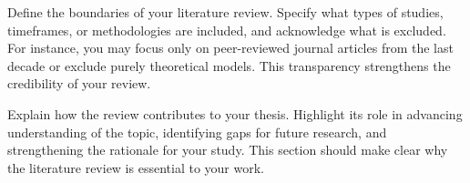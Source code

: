 Define the boundaries of your literature review. Specify what types of studies, timeframes, or methodologies are included, and acknowledge what is excluded. For instance, you may focus only on peer-reviewed journal articles from the last decade or exclude purely theoretical models. This transparency strengthens the credibility of your review.

Explain how the review contributes to your thesis. Highlight its role in advancing understanding of the topic, identifying gaps for future research, and strengthening the rationale for your study. This section should make clear why the literature review is essential to your work.

